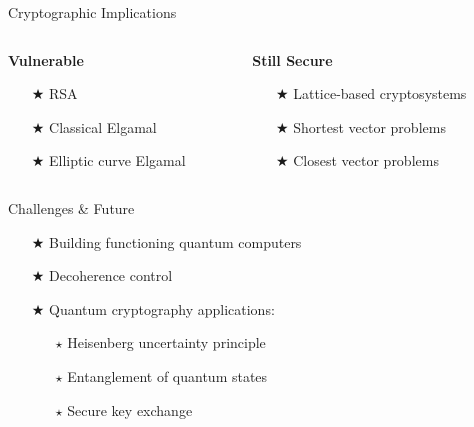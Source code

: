 \documentclass{beamer}
\begin{document}


\begin{frame}{Cryptographic Implications}
    \begin{columns}
        \begin{column}{0.5\textwidth}
            \textbf{Vulnerable}
            \begin{itemize}
                \item[$\bigstar$] RSA
                \item[$\bigstar$] Classical Elgamal
                \item[$\bigstar$] Elliptic curve Elgamal
            \end{itemize}
        \end{column}
		\pause
        \begin{column}{0.5\textwidth}
            \textbf{Still Secure}
            \begin{itemize}
                \item[$\bigstar$] Lattice-based cryptosystems
                \item[$\bigstar$] Shortest vector problems
                \item[$\bigstar$] Closest vector problems
            \end{itemize}
        \end{column}
    \end{columns}
\end{frame}




\begin{frame}{Challenges \& Future}
    \begin{itemize}
        \item[$\bigstar$] Building functioning quantum computers
        \item[$\bigstar$] Decoherence control
        \item[$\bigstar$] Quantum cryptography applications:
            \begin{itemize}
                \item[$\star$] Heisenberg uncertainty principle
                \item[$\star$] Entanglement of quantum states
                \item[$\star$] Secure key exchange
            \end{itemize}
    \end{itemize}
\end{frame}
\end{document}
